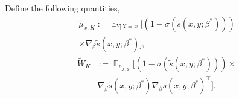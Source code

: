 \documentclass[11pt,a4paper]{article}
\DeclareMathOperator{\E}{\mathbb{E}}
\newcommand{\wt}[1]{\widetilde{#1}}
\newcommand{\gbeta}{\nabla_{\beta}}
\newcommand{\sbc}[3]{\wt{s}(#1, #2; #3)}
\newcommand{\wbk}{\wt{W}_{K}}
\newcommand{\mubxk}{\wt{\mu}_{x, K}}
\begin{document}
Define the following quantities, 
\begin{equation*}
\begin{aligned}
\mubxk := \E_{Y|X=x} \Big[ \left(1-\sigma(\sbc{x}{y}{\beta^*})\right)  \\ 
\times \gbeta\sbc{x}{y}{\beta^*}\Big],
\end{aligned}
\label{eq:beta-x-K}
\end{equation*}
\begin{equation*}
\begin{aligned}
  \wbk & := \E_{p_{X, Y}}\Big[(1-\sigma(\sbc{x}{y}{\beta^*})) \times \\ 
  & \gbeta\sbc{x}{y}{\beta^*}\gbeta\sbc{x}{y}{\beta^*}^\top\Big].
  \label{eq:W-beta-K} 
\end{aligned}
\end{equation*}
\end{document}
